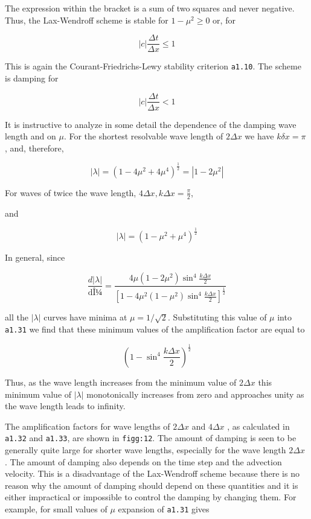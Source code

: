The expression within the bracket is a sum of two squares and never
negative. Thus, the Lax-Wendroff scheme is stable for
\(1 - \mu^{2} \geq 0\) or, for

\[\left| c \right|\frac{\Delta t}{\Delta x} \leq 1\]

This is again the Courant-Friedrichs-Lewy stability criterion
\texttt{a1.10}. The scheme is damping for

\[\left| c  \right|\frac{\Delta t}{\Delta x} < 1\]

It is instructive to analyze in some detail the dependence of the
damping wave length and on \(\mu\). For the shortest resolvable wave
length of \(2\Delta x\) we have \(k\delta x = \pi\) , and, therefore,

 \[|\lambda|  = \left( 1 - 4\mu^{2} + 4\mu^{4} \right)^{\frac{1}{2}} = \left| 1 - 2\mu^{2} \right|\]

For waves of twice the wave length,
\(4\Delta x,k\Delta x = \frac{\pi}{2}\),

and

 \[|\lambda| = \left( 1 - \mu^{2} + \mu^{4} \right)^{\frac{1}{2}}\]

In general, since

\[\frac{d|\lambda|}{\text{dÎ¼}} = \frac{4\mu\left( 1 - 2\mu^{2} \right)\sin^{4}\frac{k\Delta x}{2}}{\left\lbrack 1 - 4\mu^{2}\left( 1 - \mu^{2} \right)\sin^{4}\frac{k\Delta x}{2} \right\rbrack^{\frac{1}{2}}}\]

all the \(|\lambda|\) curves have minima at \(\mu = 1/\sqrt{2}\).
Substituting this value of \(\mu\) into \texttt{a1.31} we find that
these minimum values of the amplification factor are equal to

 \[\left( 1 - \sin^{4}\frac{k\Delta x}{2} \right)^{\frac{1}{2}}\]

Thus, as the wave length increases from the minimum value of
\(2\Delta x\) this minimum value of \(|\lambda|\) monotonically
increases from zero and approaches unity as the wave length leads to
infinity.

The amplification factors for wave lengths of \(2\Delta x\) and
\(4\Delta x\) , as calculated in \texttt{a1.32} and \texttt{a1.33}, are
shown in \texttt{figg:12}. The amount of damping is seen to be
generally quite large for shorter wave lengths, especially for the wave
length \(2\Delta x\) . The amount of damping also depends on the time
step and the advection velocity. This is a disadvantage of the
Lax-Wendroff scheme because there is no reason why the amount of damping
should depend on these quantities and it is either impractical or
impossible to control the damping by changing them. For example, for
small values of \(\mu\) expansion of \texttt{a1.31} gives

